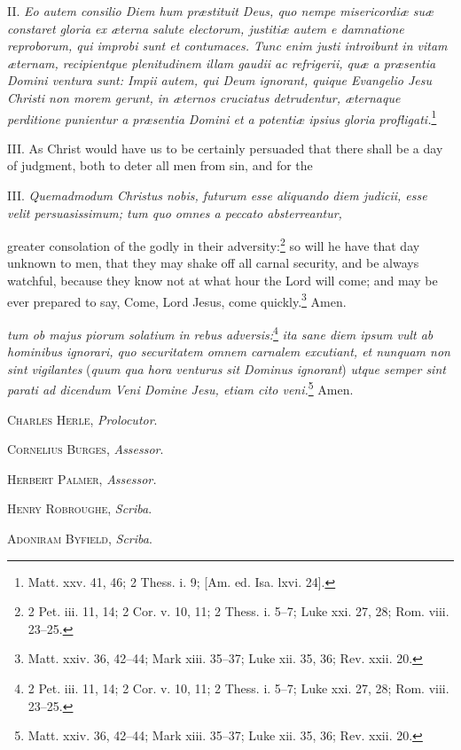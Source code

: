 II. \emph{Eo autem consilio Diem hum præstituit Deus, quo nempe misericordiæ suæ constaret gloria ex æterna salute electorum, justitiæ autem e damnatione reproborum, qui improbi sunt et contumaces. Tunc enim justi introibunt in vitam æternam, recipientque plenitudinem illam gaudii ac refrigerii, quæ a præsentia Domini ventura sunt: Impii autem, qui Deum ignorant, quique Evangelio Jesu Christi non morem gerunt, in æternos cruciatus detrudentur, æternaque perditione punientur a præsentia Domini et a potentiæ ipsius gloria profligati.}\footnote{Matt. xxv. 41, 46; 2 Thess. i. 9; [Am. ed. Isa. lxvi. 24].}

III. As Christ would have us to be certainly persuaded that there shall be a day of judgment, both to deter all men from sin, and for the

III. \emph{Quemadmodum Christus nobis, futurum esse aliquando diem judicii, esse velit persuasissimum; tum quo omnes a peccato absterreantur, }

greater consolation of the godly in their adversity:\footnote{2 Pet. iii. 11, 14; 2 Cor. v. 10, 11; 2 Thess. i. 5–7; Luke xxi. 27, 28; Rom. viii. 23–25.} so will he have that day unknown to men, that they may shake off all carnal security, and be always watchful, because they know not at what hour the Lord will come; and may be ever prepared to say, Come, Lord Jesus, come quickly.\footnote{Matt. xxiv. 36, 42–44; Mark xiii. 35–37; Luke xii. 35, 36; Rev. xxii. 20.} Amen.

\emph{tum ob majus piorum solatium in rebus adversis:}\footnote{2 Pet. iii. 11, 14; 2 Cor. v. 10, 11; 2 Thess. i. 5–7; Luke xxi. 27, 28; Rom. viii. 23–25.}\emph{ ita sane diem ipsum vult ab hominibus ignorari, quo securitatem omnem carnalem excutiant, et nunquam non sint vigilantes }(\emph{quum qua hora venturus sit Dominus ignorant})\emph{ utque semper sint parati ad dicendum Veni Domine Jesu, etiam cito veni.}\footnote{Matt. xxiv. 36, 42–44; Mark xiii. 35–37; Luke xii. 35, 36; Rev. xxii. 20.} Amen.

C\textsc{harles} H\textsc{erle}, \emph{Prolocutor}.

C\textsc{ornelius} B\textsc{urges}, \emph{Assessor}.

H\textsc{erbert} P\textsc{almer}, \emph{Assessor.}

H\textsc{enry} R\textsc{obroughe}, \emph{Scriba}.

A\textsc{doniram} B\textsc{yfield}, \emph{Scriba}.


